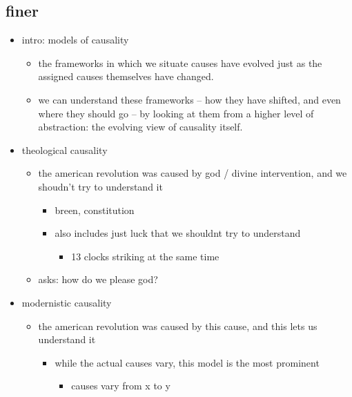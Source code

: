 \documentclass[letterpaper]{article}
\begin{document}
\subsection{finer}
\label{sec:orga603867}
\begin{itemize}
\item intro: models of causality

\begin{itemize}
\item the frameworks in which we situate causes have evolved just as the
assigned causes themselves have changed.
\item we can understand these frameworks -- how they have shifted, and
even where they should go -- by looking at them from a higher level
of abstraction: the evolving view of causality itself.
\end{itemize}

\item theological causality

\begin{itemize}
\item the american revolution was caused by god / divine intervention, and
we shoudn't try to understand it

\begin{itemize}
\item breen, constitution
\item also includes just luck that we shouldnt try to understand

\begin{itemize}
\item 13 clocks striking at the same time
\end{itemize}
\end{itemize}

\item asks: how do we please god?
\end{itemize}

\item modernistic causality

\begin{itemize}
\item the american revolution was caused by this cause, and this lets us
understand it

\begin{itemize}
\item while the actual causes vary, this model is the most prominent

\begin{itemize}
\item causes vary from x to y


\end{itemize}
\end{itemize}
\end{itemize}
\end{itemize}
\end{document}
